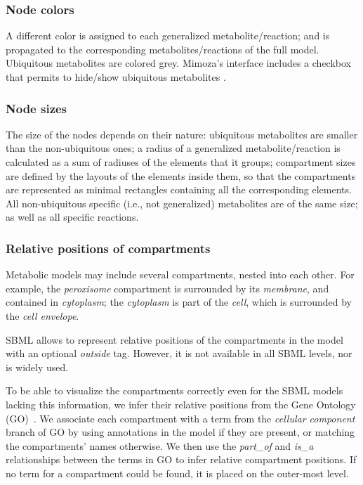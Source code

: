\documentclass{bmcart}
\begin{document}
\subsubsection*{Node colors}

A different color is assigned to each generalized metabolite/reaction; and is propagated to the corresponding metabolites/reactions of the full model. Ubiquitous metabolites are colored grey. Mimoza's interface includes a checkbox that permits to hide/show ubiquitous metabolites .

\subsubsection*{Node sizes}

The size of the nodes depends on their nature: ubiquitous metabolites are smaller than the non-ubiquitous ones; a radius of a generalized metabolite/reaction is calculated as a sum of radiuses of the elements that it groups; compartment sizes are defined by the layouts of the elements inside them, so that the compartments are represented as minimal rectangles containing all the corresponding elements. All non-ubiquitous specific (i.e., not generalized) metabolites are of the same size; as well as all specific reactions.

\subsubsection*{Relative positions of compartments}
Metabolic models may include several compartments, nested into each other. For example, the \emph{peroxisome} compartment is surrounded by its \emph{membrane}, and contained in \emph{cytoplasm}; the \emph{cytoplasm} is part of the \emph{cell}, which is surrounded by the \emph{cell envelope}.

SBML allows to represent relative positions of the compartments in the model with an optional \emph{outside} tag. However, it is not available in all SBML levels, nor is widely used.

To be able to visualize the compartments correctly even for the SBML models lacking this information, we infer their relative positions from the Gene Ontology (GO)~\cite{Ashburner2000}. We associate each compartment with a term from the \emph{cellular component} branch of GO by using annotations in the model if they are present, or matching the compartments' names otherwise. We then use the \emph{part\_of} and \emph{is\_a} relationships between the terms in GO to infer relative compartment positions. If no term for a compartment could be found, it is placed on the outer-most level. 
\end{document}

